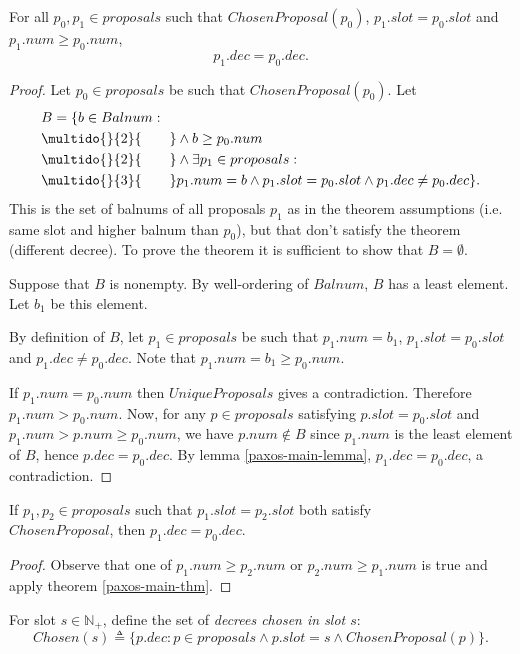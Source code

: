\documentclass[12pt,a4paper,en]{pracamgr}
\newcommand{\ti}[1]{\textit{#1}}
\newcommand{\mbb}[1]{\mathbb{#1}}
\newcommand{\ind}[1]{\multido{}{#1}{\qquad}}
\begin{document}
\begin{thm}\label{paxos-main-thm}
    For all $p_0, p_1 \in proposals$ such that $ChosenProposal(p_0)$, $p_1.slot = p_0.slot$ and $p_1.num \ge p_0.num$,
    $$p_1.dec = p_0.dec.$$
\end{thm}
\begin{proof}
    Let $p_0 \in proposals$ be such that $ChosenProposal(p_0)$. Let
    \begin{align*}
        & B = \{b \in Balnum:\\
        & \ind{2} \land b \ge p_0.num\\
        & \ind{2} \land \exists p_1 \in proposals:\\
        & \ind{3} p_1.num = b \land p_1.slot = p_0.slot \land p_1.dec \neq p_0.dec\}.
    \end{align*}
    This is the set of balnums of all proposals $p_1$ as in the theorem assumptions (i.e. same slot and higher balnum than $p_0$), but that don't satisfy the theorem (different decree). To prove the theorem it is sufficient to show that $B = \emptyset$.

    Suppose that $B$ is nonempty. By well-ordering of $Balnum$, $B$ has a least element. Let $b_1$ be this element.

    By definition of $B$, let $p_1 \in proposals$ be such that $p_1.num = b_1$, $p_1.slot = p_0.slot$ and $p_1.dec \neq p_0.dec$. Note that $p_1.num = b_1 \ge p_0.num$.

    If $p_1.num = p_0.num$ then $UniqueProposals$ gives a contradiction. Therefore $p_1.num > p_0.num$. Now, for any $p \in proposals$ satisfying $p.slot = p_0.slot$ and $p_1.num > p.num \ge p_0.num$, we have $p.num \notin B$ since $p_1.num$ is the least element of $B$, hence $p.dec = p_0.dec$. By lemma \ref{paxos-main-lemma}, $p_1.dec = p_0.dec$, a contradiction.
\end{proof}

\begin{coro}
    If $p_1, p_2 \in proposals$ such that $p_1.slot = p_2.slot$ both satisfy\\
    $ChosenProposal$, then $p_1.dec = p_0.dec$.
\end{coro}
\begin{proof}
    Observe that one of $p_1.num \ge p_2.num$ or $p_2.num \ge p_1.num$ is true and apply theorem \ref{paxos-main-thm}.
\end{proof}

For slot $s \in \mbb N_+$, define the set of \ti{decrees chosen in slot $s$}:
$$ Chosen(s) \triangleq \{p.dec: p \in proposals \land p.slot = s \land ChosenProposal(p)\}. $$
\end{document}

